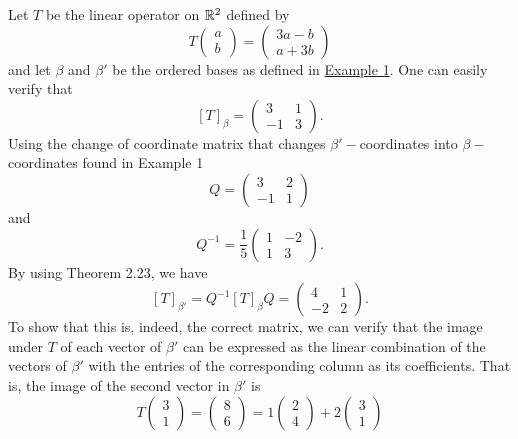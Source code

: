 \begin{eg}
    Let \( T  \) be the linear operator on \( \mathbb{R}^{2}  \) defined by 
    \[  T \begin{pmatrix}
        a \\
        b
    \end{pmatrix} = \begin{pmatrix}
        3a -b \\
        a + 3b
    \end{pmatrix} \]
    and let \( \beta \) and \( \beta'  \) be the ordered bases as defined in {\hyperref[Example 2.5.1]{Example 1}}. One can easily verify that 
    \[  [T]_{\beta} =  \begin{pmatrix}
        3 & 1 \\
        -1 & 3 
    \end{pmatrix}.\]
Using the change of coordinate matrix that changes \( \beta'  -\)coordinates into \( \beta- \)coordinates found in Example 1
\[ Q = \begin{pmatrix}
    3  & 2 \\
    -1 & 1 
\end{pmatrix}  \]
and 
\[ Q^{-1} = \frac{ 1 }{ 5 }  \begin{pmatrix}
    1 & - 2 \\
    1 & 3 
\end{pmatrix}.  \]
By using Theorem 2.23, we have 
\[  [T]_{\beta'} = Q^{-1} [T]_{\beta} Q = \begin{pmatrix}
    4 & 1 \\
    -2 & 2 
\end{pmatrix}. \]
To show that this is, indeed, the correct matrix, we can verify that the image under \( T  \) of each vector of \( \beta'  \) can be expressed as the linear combination of the vectors of \( \beta'  \) with the entries of the corresponding column as its coefficients. That is, the image of the second vector in \( \beta'  \) is 
\[  T \begin{pmatrix}
    3 \\
    1 
\end{pmatrix} = \begin{pmatrix}
    8 \\
    6 
\end{pmatrix} = 1 \begin{pmatrix}
    2 \\
    4
\end{pmatrix} + 2 \begin{pmatrix}
    3 \\
    1
\end{pmatrix} \]

\end{eg}
